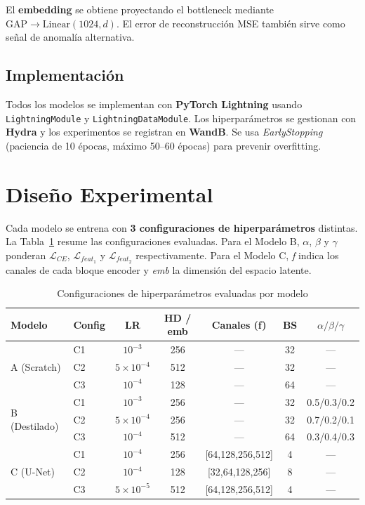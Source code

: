 \documentclass[conference]{IEEEtran}
\begin{document}
El \textbf{embedding} se obtiene proyectando el bottleneck mediante
$\text{GAP} \rightarrow \text{Linear}(1024, d)$. El error de reconstrucción MSE
también sirve como señal de anomalía alternativa.

\subsection{Implementación}

Todos los modelos se implementan con \textbf{PyTorch Lightning} usando
\texttt{LightningModule} y \texttt{LightningDataModule}. Los hiperparámetros
se gestionan con \textbf{Hydra} y los experimentos se registran en \textbf{WandB}.
Se usa \textit{EarlyStopping} (paciencia de 10 épocas, máximo 50--60 épocas)
para prevenir overfitting.

\section{Diseño Experimental}

Cada modelo se entrena con \textbf{3 configuraciones de hiperparámetros} distintas.
La Tabla~\ref{tab:hyperparams} resume las configuraciones evaluadas. Para el
Modelo B, $\alpha$, $\beta$ y $\gamma$ ponderan $\mathcal{L}_{CE}$,
$\mathcal{L}_{feat_1}$ y $\mathcal{L}_{feat_2}$ respectivamente.
Para el Modelo C, \textit{f} indica los canales de cada bloque encoder y
\textit{emb} la dimensión del espacio latente.

\begin{table}[t]
\centering
\caption{Configuraciones de hiperparámetros evaluadas por modelo}
\label{tab:hyperparams}
\begin{tabular}{llccccc}
\toprule
Modelo & Config & LR & HD / emb & Canales (f) & BS & $\alpha/\beta/\gamma$ \\
\midrule
\multirow{3}{*}{A (Scratch)}
  & C1 & $10^{-3}$       & 256 & —                  & 32 & — \\
  & C2 & $5\!\times\!10^{-4}$ & 512 & —             & 32 & — \\
  & C3 & $10^{-4}$       & 128 & —                  & 64 & — \\
\midrule
\multirow{3}{*}{B (Destilado)}
  & C1 & $10^{-3}$       & 256 & —                  & 32 & 0.5/0.3/0.2 \\
  & C2 & $5\!\times\!10^{-4}$ & 256 & —             & 32 & 0.7/0.2/0.1 \\
  & C3 & $10^{-4}$       & 512 & —                  & 64 & 0.3/0.4/0.3 \\
\midrule
\multirow{3}{*}{C (U-Net)}
  & C1 & $10^{-4}$       & 256 & [64,128,256,512]   &  4 & — \\
  & C2 & $10^{-4}$       & 128 & [32,64,128,256]    &  8 & — \\
  & C3 & $5\!\times\!10^{-5}$ & 512 & [64,128,256,512] & 4 & — \\
\bottomrule
\end{tabular}
\end{table}
\end{document}
